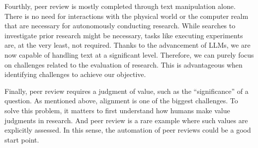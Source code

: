 
Fourthly, peer review is mostly completed through text manipulation alone. There is no need for interactions with the physical world or the computer realm that are necessary for autonomously conducting research. While searches to investigate prior research might be necessary, tasks like executing experiments are, at the very least, not required. Thanks to the advancement of LLMs, we are now capable of handling text at a significant level. Therefore, we can purely focus on challenges related to the evaluation of research. This is advantageous when identifying challenges to achieve our objective.


Finally, peer review requires a judgment of value, such as the ``significance'' of a question. As mentioned above, alignment is one of the biggest challenges. To solve this problem, it matters to first understand how humans make value judgments in research. And peer review is a rare example where such values are explicitly assessed. In this sense, the automation of peer reviews could be a good start point.



